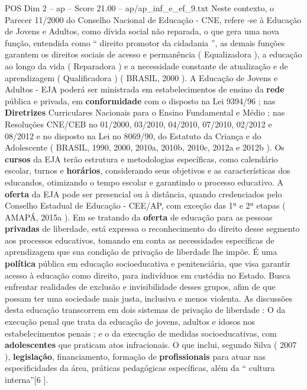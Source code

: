 \begin{textsample}{POS Dim 2 – ap – Score 21.00 – ap/ap\_inf\_e\_ef\_9.txt}
Neste contexto, o Parecer 11/2000 do Conselho Nacional de Educação - CNE, refere -se à Educação de Jovens e Adultos, como dívida social não reparada, o que gera uma nova função, entendida como “ direito promotor da cidadania ”, as demais funções garantem os direitos sociais de acesso e permanência ( Equalizadora ), a educação ao longo da vida ( Reparadora ) e a necessidade constante de atualização e de aprendizagem ( Qualificadora ) ( BRASIL, 2000 ).
A Educação de Jovens e Adultos - EJA poderá ser ministrada em estabelecimentos de ensino da \textbf{rede} pública e privada, em \textbf{conformidade} com o disposto na Lei 9394/96 ; nas \textbf{Diretrizes} Curriculares Nacionais para o Ensino Fundamental e Médio ; nas Resoluções CNE/CEB no 01/2000, 03/2010, 04/2010, 07/2010, 02/2012 e 08/2012 e no disposto na Lei no 8069/90, do Estatuto da Criança e do Adolescente ( BRASIL, 1990, 2000, 2010a, 2010b, 2010c, 2012a e 2012b ).
Os \textbf{cursos} da EJA terão estrutura e metodologias específicas, como calendário escolar, turnos e \textbf{horários}, considerando seus objetivos e as características dos educandos, otimizando o tempo escolar e garantindo o processo educativo.
A \textbf{oferta} da EJA pode ser presencial ou à distância, quando credenciados pelo Conselho Estadual de Educação - CEE/AP, com exceção das 1ª e 2ª etapas ( AMAPÁ, 2015a ).
Em se tratando da \textbf{oferta} de educação para as pessoas \textbf{privadas} de liberdade, está expressa o reconhecimento do direito desse segmento aos processos educativos, tomando em conta as necessidades específicas de aprendizagem que sua condição de privação de liberdade lhe impõe.
É uma \textbf{política} pública em educação socioeducativa e penitenciária, que visa garantir acesso à educação como direito, para indivíduos em custódia no Estado.
Busca enfrentar realidades de exclusão e invisibilidade desses grupos, afim de que possam ter uma sociedade mais justa, inclusiva e menos violenta.
As discussões desta educação transcorrem em dois sistemas de privação de liberdade : O da execução penal que trata da educação de jovens, adultos e idosos nos estabelecimentos penais ; e o da execução de medidas socioeducativas, com \textbf{adolescentes} que praticam atos infracionais.
O que inclui, segundo Silva ( 2007 ), \textbf{legislação}, financiamento, formação de \textbf{profissionais} para atuar nas especificidades da área, práticas pedagógicas específicas, além da “ cultura interna”[6 ].

\end{textsample}
